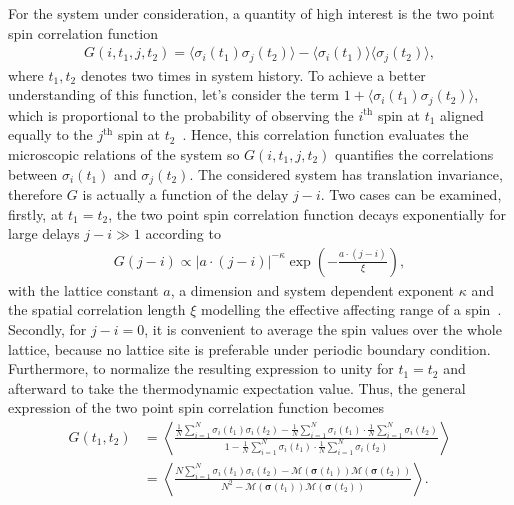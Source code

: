 For the system under consideration, a quantity of high interest is the two point spin correlation function
\begin{align*}
    G(i,t_1,j,t_2)=\langle \sigma_i(t_1)\sigma_j(t_2) \rangle - \langle \sigma_i(t_1) \rangle\langle \sigma_j(t_2) \rangle,
\end{align*}
where $t_1,t_2$ denotes two times in system history. To achieve a better understanding of this function, let's consider the term 
$1\!+\!\langle \sigma_i(t_1)\sigma_j(t_2) \rangle$, which is proportional to the probability of observing the $i^\text{th}$ spin at $t_1$
aligned equally to the $j^\text{th}$ spin at $t_2$~\cite{Stanley1987}. Hence, this correlation function evaluates the microscopic relations of the 
system so $G(i,t_1,j,t_2)$ quantifies the correlations between $\sigma_i(t_1)$ and $\sigma_j(t_2)$. The considered system has translation 
invariance, therefore $G$ is actually a function of the delay $j\!-\!i$. Two cases can be examined, firstly, at $t_1\!=\!t_2$, the two point spin correlation
function decays exponentially for large delays $j\!-\!i\gg 1$ according to
\begin{align*}
    G(j\!-\!i)\propto |a\cdot(j\!-\!i)|^{-\kappa}\exp\left(-\frac{a\cdot(j\!-\!i)}{\xi}\right),
\end{align*}
with the lattice constant $a$, a dimension and system dependent exponent $\kappa$ and the spatial correlation length $\xi$ modelling the effective 
affecting range of a spin~\cite{Janke2012}. Secondly, for $j\!-\!i=0$, it is convenient to average the spin values over 
the whole lattice, because no lattice site is preferable under periodic boundary condition. Furthermore, to normalize the resulting expression to unity 
for $t_1\!=\!t_2$ and afterward to take the thermodynamic expectation value. Thus, the general expression of the two point spin correlation function becomes
\begin{align}
    G(t_1,t_2) &= \left\langle \frac{\frac{1}{N}\sum_{i=1}^N\sigma_i(t_1)\sigma_i(t_2)-\frac{1}{N}\sum_{i=1}^N\sigma_i(t_1)\cdot\frac{1}{N}\sum_{i=1}^N\sigma_i(t_2)}
                                    {1-\frac{1}{N}\sum_{i=1}^N\sigma_i(t_1)\cdot\frac{1}{N}\sum_{i=1}^N\sigma_i(t_2)}\right\rangle \nonumber \\
               &= \left\langle \frac{N\sum_{i=1}^N\sigma_i(t_1)\sigma_i(t_2)-\mathcal{M}(\bm{\sigma}(t_1))\mathcal{M}(\bm{\sigma}(t_2))}
                                    {N^2-\mathcal{M}(\bm{\sigma}(t_1))\mathcal{M}(\bm{\sigma}(t_2))}\right\rangle.
    \label{align:spin_correlation}
\end{align}

